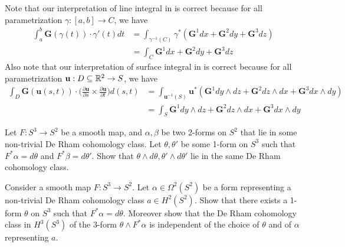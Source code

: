 \documentclass{report}
\begin{document}
\begin{mdframed}
Note that our interpretation of line integral in  is correct because for all parametrization $\gamma :[a,b]\rightarrow C$, we have 
\begin{align*}
\int_a^b \textbf{G}(\gamma (t)) \cdot \gamma '(t)dt &= \int_{\gamma^{-1}(C)}\gamma ^* (\textbf{G}^1 dx + \textbf{G}^2 dy + \textbf{G}^3 dz) \\
&=\int_C \textbf{G}^1 dx + \textbf{G}^2 dy + \textbf{G}^3 dz
\end{align*}
Also note that our interpretation of surface integral in  is correct because for all parametrization $\textbf{u}:D\subseteq\mathbb{R}^2 \rightarrow S$, we have 
\begin{align*}
\int_D \textbf{G} (\textbf{u}(s,t))\cdot \Big(\frac{\partial \textbf{u}}{\partial s}\times \frac{\partial \textbf{u}}{\partial t} \Big) d(s,t)&= \int_{\textbf{u}^{-1}(S)}\textbf{u}^* (\textbf{G}^1 dy \wedge  dz + \textbf{G}^2 dz \wedge  dx + \textbf{G}^3 dx \wedge  dy   ) \\
&=\int_{S} \textbf{G}^1 dy \wedge  dz + \textbf{G}^2  dz\wedge  dx + \textbf{G}^3 dx \wedge  dy  
\end{align*}
\end{mdframed}
\begin{mdframed}
Let $F:S^3 \rightarrow S^2$ be a smooth map, and $\alpha ,\beta  $ be two 2-forms on  $S^2$ that lie in some non-trivial De Rham cohomology class.  Let $\theta,\theta'$ be some 1-form on $S^3$ such that  $F^* \alpha = d\theta$ and $F^* \beta = d \theta'$. Show that $\theta \wedge  d \theta ,\theta '\wedge  d \theta ' $ lie in the same De Rham cohomology class. 
\end{mdframed}
\begin{question}{}{}
Consider a smooth map $F:S^3 \rightarrow S^2$. Let $\alpha \in \Omega^2 (S^2)$ be a form representing a non-trivial De Rham cohomology class $a\in H^2(S^2)$. Show that there exists a 1-form $\theta$ on $S^3$ such that $F^* \alpha = d\theta$. Moreover show that the De Rham cohomology class in $H^3 (S^3)$ of the 3-form $\theta \wedge  F^* \alpha  $ is independent of the choice of $\theta$ and of $\alpha $ representing $a$. 
\end{question}
\end{document}
